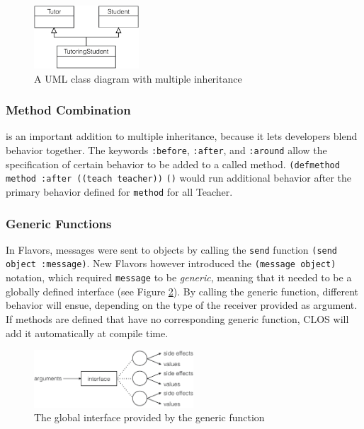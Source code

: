 \documentclass[oribibl]{llncs}
\begin{document}
\begin{figure}[]
    \centering
    \includegraphics[width=0.35\textwidth]{images/multipleinheritance2.png}
    \caption{A UML class diagram with multiple inheritance}
    \label{fig:multipleinheritance}
\end{figure}

\subsubsection{Method Combination}
\label{sec:metcom}
is an important addition to multiple inheritance, because it lets developers blend behavior together. The keywords \texttt{:before}, \texttt{:after}, and \texttt{:around} allow the specification of certain behavior to be added to a called method. \texttt{(defmethod method :after}\texttt{ ((teach teacher))}
    \texttt{()} would run additional behavior after the primary behavior defined for \texttt{method} for all Teacher. 


\subsubsection{Generic Functions}
\label{sec:genfun}
In Flavors, messages were sent to objects by calling the \texttt{send} function \texttt{(send object :message)}. New Flavors however introduced the \texttt{(message object)} notation, which required \texttt{message} to be \emph{generic}, meaning that it needed to be a globally defined interface (see Figure \ref{fig:genericfunction}). By calling the generic function, different behavior will ensue, depending on the type of the receiver provided as argument. If methods are defined that have no corresponding generic function, CLOS will add it automatically at compile time.


\begin{figure}[]
    \centering
    \includegraphics[width=0.53\textwidth]{images/genericfunction.png}
    \caption{The global interface provided by the generic function}
    \label{fig:genericfunction}
\end{figure}
\end{document}
